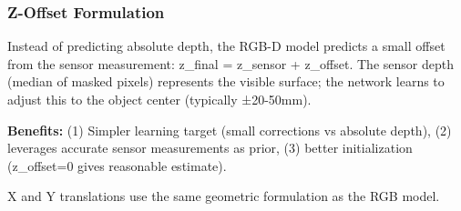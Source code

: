 \subsubsection{Z-Offset Formulation}
Instead of predicting absolute depth, the RGB-D model predicts a small offset from the sensor measurement: z\_final = z\_sensor + z\_offset. The sensor depth (median of masked pixels) represents the visible surface; the network learns to adjust this to the object center (typically ±20-50mm).

\textbf{Benefits:} (1) Simpler learning target (small corrections vs absolute depth), (2) leverages accurate sensor measurements as prior, (3) better initialization (z\_offset=0 gives reasonable estimate).

X and Y translations use the same geometric formulation as the RGB model.